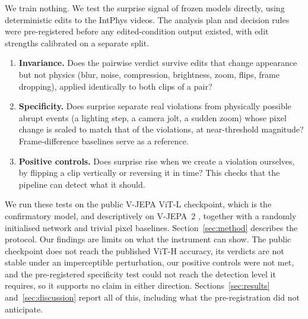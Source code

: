 We train nothing. We test the surprise signal of frozen models directly, using deterministic edits to the IntPhys videos. The analysis plan and decision rules were pre-registered before any edited-condition output existed, with edit strengths calibrated on a separate split.

\begin{enumerate}
\item \textbf{Invariance.} Does the pairwise verdict survive edits that change appearance but not physics (blur, noise, compression, brightness, zoom, flips, frame dropping), applied identically to both clips of a pair?
\item \textbf{Specificity.} Does surprise separate real violations from physically possible abrupt events (a lighting step, a camera jolt, a sudden zoom) whose pixel change is scaled to match that of the violations, at near-threshold magnitude? Frame-difference baselines serve as a reference.
\item \textbf{Positive controls.} Does surprise rise when we create a violation ourselves, by flipping a clip vertically or reversing it in time? This checks that the pipeline can detect what it should.
\end{enumerate}

We run these tests on the public V-JEPA ViT-L checkpoint, which is the confirmatory model, and descriptively on V-JEPA~2 \cite{assran2025}, together with a randomly initialised network and trivial pixel baselines. Section~\ref{sec:method} describes the protocol. Our findings are limits on what the instrument can show. The public checkpoint does not reach the published ViT-H accuracy, its verdicts are not stable under an imperceptible perturbation, our positive controls were not met, and the pre-registered specificity test could not reach the detection level it requires, so it supports no claim in either direction. Sections~\ref{sec:results} and~\ref{sec:discussion} report all of this, including what the pre-registration did not anticipate.
